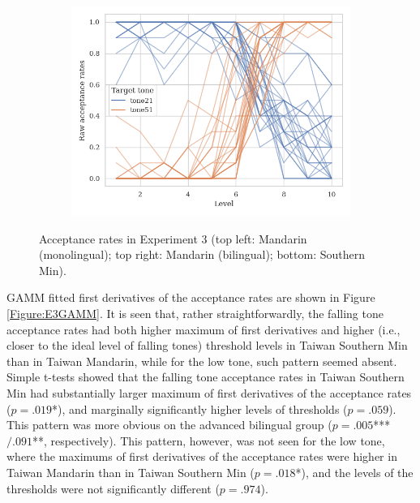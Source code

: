 \begin{figure}[hbt!]
\begin{subfigure}[b]{.45\textwidth}
\includegraphics[width=\textwidth]{figures/E3/Min_E3_raw.png}
\end{subfigure}
\caption{Acceptance rates in Experiment 3 (top left: Mandarin (monolingual); top right: Mandarin (bilingual); bottom: Southern Min).}
\label{Figure:E3Raw}
\end{figure}

GAMM fitted first derivatives of the acceptance rates are shown in Figure \ref{Figure:E3GAMM}. It is seen that, rather straightforwardly, the falling tone acceptance rates had both higher maximum of first derivatives and higher (i.e., closer to the ideal level of falling tones) threshold levels in Taiwan Southern Min than in Taiwan Mandarin, while for the low tone, such pattern seemed absent. Simple t-tests showed that the falling tone acceptance rates in Taiwan Southern Min had substantially larger maximum of first derivatives of the acceptance rates ($p=.019$*), and marginally significantly higher levels of thresholds ($p=.059$). This pattern was more obvious on the advanced bilingual group ($p=.005$***$/.091$**, respectively). This pattern, however, was not seen for the low tone, where the maximums of first derivatives of the acceptance rates were higher in Taiwan Mandarin than in Taiwan Southern Min ($p=.018$*), and the levels of the thresholds were not significantly different ($p=.974$).

